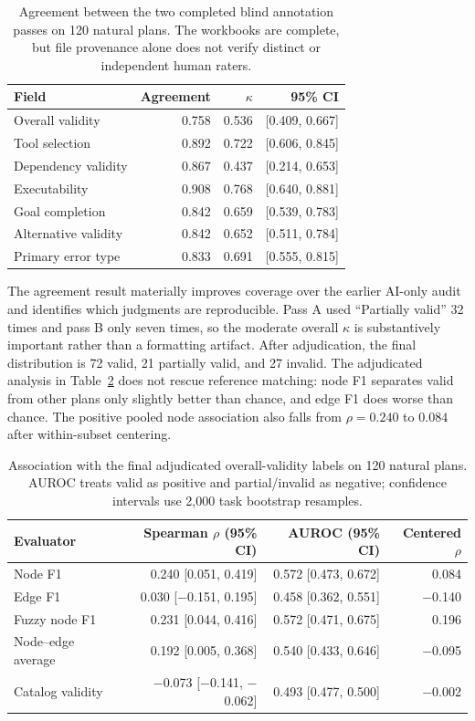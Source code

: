 \documentclass[10pt]{article}
\begin{document}
\begin{table}[t]
\centering
\caption{Agreement between the two completed blind annotation passes on 120
natural plans. The workbooks are complete, but file provenance alone does not
verify distinct or independent human raters.}
\label{tab:pairedagreement}
\begin{tabular}{lrrr}
\toprule
Field & Agreement & $\kappa$ & 95\% CI \\
\midrule
Overall validity & 0.758 & 0.536 & [0.409, 0.667] \\
Tool selection & 0.892 & 0.722 & [0.606, 0.845] \\
Dependency validity & 0.867 & 0.437 & [0.214, 0.653] \\
Executability & 0.908 & 0.768 & [0.640, 0.881] \\
Goal completion & 0.842 & 0.659 & [0.539, 0.783] \\
Alternative validity & 0.842 & 0.652 & [0.511, 0.784] \\
Primary error type & 0.833 & 0.691 & [0.555, 0.815] \\
\bottomrule
\end{tabular}
\end{table}

The agreement result materially improves coverage over the earlier AI-only
audit and identifies which judgments are reproducible. Pass A used
``Partially valid'' 32 times and pass B only seven times, so the moderate
overall $\kappa$ is substantively important rather than a formatting artifact.
After adjudication, the final distribution is 72 valid, 21 partially valid,
and 27 invalid. The adjudicated analysis in Table~\ref{tab:adjudicatedmetrics}
does not rescue reference matching: node F1 separates valid from other plans
only slightly better than chance, and edge F1 does worse than chance. The
positive pooled node association also falls from $\rho=0.240$ to $0.084$ after
within-subset centering.

\begin{table}[t]
\centering
\caption{Association with the final adjudicated overall-validity labels on 120
natural plans. AUROC treats valid as positive and partial/invalid as negative;
confidence intervals use 2,000 task bootstrap resamples.}
\label{tab:adjudicatedmetrics}
\begin{tabular}{lrrr}
\toprule
Evaluator & Spearman $\rho$ (95\% CI) & AUROC (95\% CI) & Centered $\rho$ \\
\midrule
Node F1 & 0.240 [0.051, 0.419] & 0.572 [0.473, 0.672] & 0.084 \\
Edge F1 & 0.030 [$-$0.151, 0.195] & 0.458 [0.362, 0.551] & $-$0.140 \\
Fuzzy node F1 & 0.231 [0.044, 0.416] & 0.572 [0.471, 0.675] & 0.196 \\
Node--edge average & 0.192 [0.005, 0.368] & 0.540 [0.433, 0.646] & $-$0.095 \\
Catalog validity & $-$0.073 [$-$0.141, $-$0.062] & 0.493 [0.477, 0.500] & $-$0.002 \\
\bottomrule
\end{tabular}
\end{table}
\end{document}
